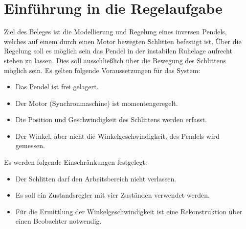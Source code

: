 \documentclass[
	pagesize,
	fontsize=12pt,
	paper=a4,
	oneside,
   reqno
]{scrartcl}
\begin{document}
\clearpage

\renewcommand{\contentsname}{Inhaltsverzeichnis}
\tableofcontents
\clearpage

\renewcommand{\listfigurename}{Abbildungsverzeichnis}
\renewcommand*{\figurename}{Abb.}
\listoffigures

\renewcommand*{\listtablename}{Tabellenverzeichnis}
\renewcommand*{\tablename}{Tab.}
\listoftables
\clearpage



\section{Einführung in die Regelaufgabe}

Ziel des Beleges ist die Modellierung und Regelung eines inversen Pendels, welches auf einem durch einen Motor bewegten Schlitten befestigt ist. Über die Regelung soll es möglich sein das Pendel in der instabilen Ruhelage aufrecht stehen zu lassen. Dies soll ausschließlich über die Bewegung des Schlittens möglich sein. Es gelten folgende Voraussetzungen für das System:

\begin{itemize}
    \item Das Pendel ist frei gelagert.
    \item Der Motor (Synchronmaschine) ist momentengeregelt.
    \item Die Position und Geschwindigkeit des Schlittens werden erfasst.
    \item Der Winkel, aber nicht die Winkelgeschwindigkeit, des Pendels wird gemessen.
\end{itemize}

Es werden folgende Einschränkungen festgelegt:

\begin{itemize}
    \item Der Schlitten darf den Arbeitsbereich nicht verlassen.
    \item Es soll ein Zustandsregler mit vier Zuständen verwendet werden.
    \item Für die Ermittlung der Winkelgeschwindigkeit ist eine Rekonstruktion über einen Beobachter notwendig.
\end{itemize}
\end{document}
